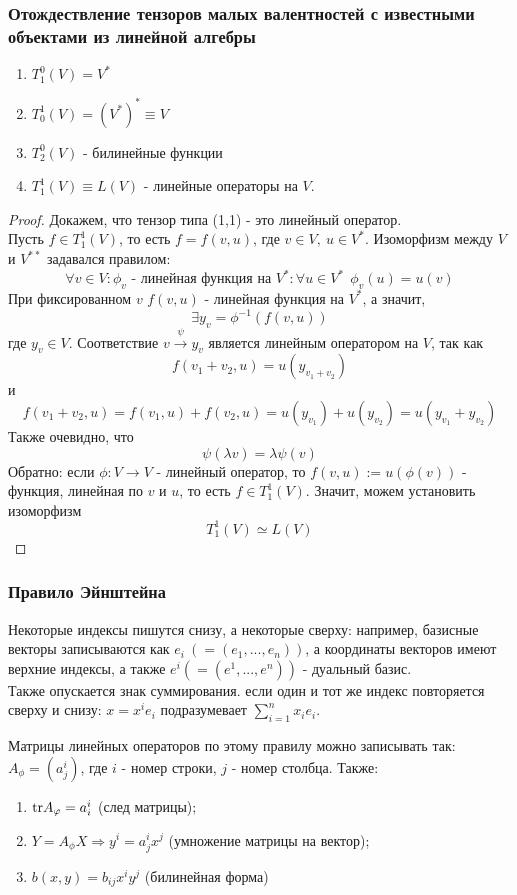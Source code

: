 \subsubsection*{Отождествление тензоров малых валентностей с известными объектами из линейной алгебры}
\begin{theorem}\tab
    \begin{enumerate}
        \item $T_1^0(V)=V^*$
        \item $T_0^1(V)=(V^*)^* \equiv V$
        \item $T_2^0(V)$ - билинейные функции
        \item $T_1^1(V) \equiv L(V)$ - линейные операторы на $V$.
    \end{enumerate}
\end{theorem} 
\begin{proof}
    Докажем, что тензор типа (1,1) - это линейный оператор.\\
    Пусть $f\in T_1^1(V)$, то есть $f=f(v,u)$, где $v\in V,\ u\in V^*$. Изоморфизм между $V$ и $V^{**}$ задавался правилом:
    \[ \forall v\in V: \phi_v \text{ - линейная функция на } V^*: \forall u\in V^*\ \ \phi_v(u)=u(v)\]
    При фиксированном $v$ $f(v,u)$ - линейная функция на $V^*$, а значит,
    \[\exists y_v = \phi^{-1}(f(v, u))\]
    где $y_v\in V$. Соответствие $v\xrightarrow{\psi} y_v$ является линейным оператором на $V$, так как 
    \[f(v_1+v_2,u)=u(y_{v_1+v_2})\]
    и 
    \[f(v_1+v_2,u)=f(v_1,u)+f(v_2,u)=u(y_{v_1})+u(y_{v_2})=u(y_{v_1}+y_{v_2})\]
    Также очевидно, что 
    \[\psi(\lambda v)=\lambda\psi(v)\]
    Обратно: если $\phi: V\to V$ - линейный оператор, то $f(v,u):=u(\phi(v))$ - функция, линейная по $v$ и $u$, то есть $f\in T^1_1(V)$. Значит, можем установить изоморфизм
    \[T_1^1(V)\simeq L(V)\]
\end{proof}  
\subsubsection*{Правило Эйнштейна}
Некоторые индексы пишутся снизу, а некоторые сверху: например, базисные векторы записываются как $e_i \ (= (e_1,...,e_n))$, а координаты векторов имеют верхние индексы, а также $e^i (=(e^1,...,e^n))$ - дуальный базис.\\
Также опускается знак суммирования. если один и тот же индекс повторяется сверху и снизу: $x = x^ie_i$ подразумевает $\sum \limits_{i=1}^n x_ie_i$.

Матрицы линейных операторов по этому правилу можно записывать так: $A_\phi = (a_j^i)$, где $i$ - номер строки, $j$ - номер столбца. Также:
\begin{enumerate}
    \item $\textup{tr} A_\phi = a_i^i$ (след матрицы);
    \item $Y = A_\phi X \Longrightarrow y^i = a_j^ix^j$ (умножение матрицы на вектор);
    \item $b(x, y) = b_{ij}x^iy^j$ (билинейная форма)
\end{enumerate}


